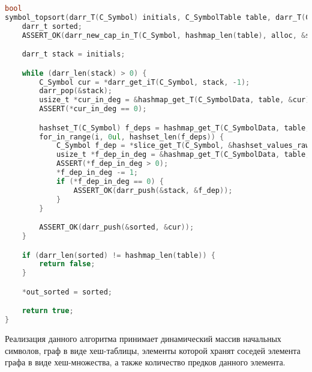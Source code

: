 \begin{lstlisting}[language=c, caption={Реализация алгоритма Кана}, label={pass:ordering:kahn-impl}]
bool
symbol_topsort(darr_T(C_Symbol) initials, C_SymbolTable table, darr_T(C_Symbol) *out_sorted, Allocator *alloc) {
    darr_t sorted;
    ASSERT_OK(darr_new_cap_in_T(C_Symbol, hashmap_len(table), alloc, &sorted));

    darr_t stack = initials;

    while (darr_len(stack) > 0) {
        C_Symbol cur = *darr_get_iT(C_Symbol, stack, -1);
        darr_pop(&stack);
        usize_t *cur_in_deg = &hashmap_get_T(C_SymbolData, table, &cur)->in_deg;
        ASSERT(*cur_in_deg == 0);

        hashset_T(C_Symbol) f_deps = hashmap_get_T(C_SymbolData, table, &cur)->f_deps;
        for_in_range(i, 0ul, hashset_len(f_deps)) {
            C_Symbol f_dep = *slice_get_T(C_Symbol, &hashset_values_raw(f_deps), i);
            usize_t *f_dep_in_deg = &hashmap_get_T(C_SymbolData, table, &f_dep)->in_deg;
            ASSERT(*f_dep_in_deg > 0);
            *f_dep_in_deg -= 1;
            if (*f_dep_in_deg == 0) {
                ASSERT_OK(darr_push(&stack, &f_dep));
            }
        }

        ASSERT_OK(darr_push(&sorted, &cur));
    }

    if (darr_len(sorted) != hashmap_len(table)) {
        return false;
    }

    *out_sorted = sorted;

    return true;
}
\end{lstlisting}

Реализация данного алгоритма принимает динамический массив начальных символов, граф в виде хеш-таблицы, элементы которой хранят соседей элемента графа в виде хеш-множества, а также количество предков данного элемента.

